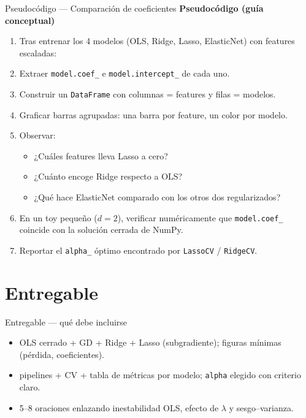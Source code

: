 \begin{frame}{Pseudocódigo — Comparación de coeficientes}
\footnotesize
\textbf{Pseudocódigo (guía conceptual)}
\begin{enumerate}\footnotesize
  \item Tras entrenar los 4 modelos (OLS, Ridge, Lasso, ElasticNet) con features escaladas:
  \item Extraer \texttt{model.coef\_} e \texttt{model.intercept\_} de cada uno.
  \item Construir un \texttt{DataFrame} con columnas = features y filas = modelos.
  \item Graficar barras agrupadas: una barra por feature, un color por modelo.
  \item Observar:
  \begin{itemize}\scriptsize
    \item ¿Cuáles features lleva Lasso a cero?
    \item ¿Cuánto encoge Ridge respecto a OLS?
    \item ¿Qué hace ElasticNet comparado con los otros dos regularizados?
  \end{itemize}
  \item En un toy pequeño ($d=2$), verificar numéricamente que \texttt{model.coef\_} coincide con la solución cerrada de NumPy.
  \item Reportar el \texttt{alpha\_} óptimo encontrado por \texttt{LassoCV} / \texttt{RidgeCV}.
\end{enumerate}
\end{frame}

\section[Entregable]{Entregable\label{sec:entregable-w09}}

\begin{frame}{Entregable — qué debe incluirse}
\begin{itemize}\small
  \item {} OLS cerrado + GD + Ridge + Lasso (subgradiente); figuras mínimas (pérdida, coeficientes).
  \item {} pipelines + CV + tabla de métricas por modelo; \texttt{alpha} elegido con criterio claro.
  \item {} 5--8 oraciones enlazando inestabilidad OLS, efecto de $\lambda$ y sesgo--varianza.
\end{itemize}
\end{frame}

